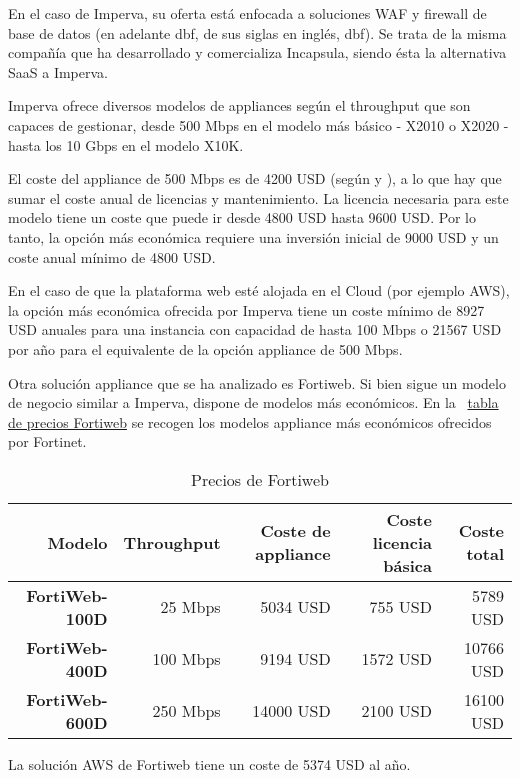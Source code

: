 \par En el caso de Imperva, su oferta está enfocada a soluciones WAF y firewall de base de datos (en adelante \acrshort{dbf}, de sus siglas en
inglés, \acrlong{dbf}). Se trata de la misma compañía que ha desarrollado y comercializa Incapsula, siendo ésta la alternativa SaaS a Imperva.
\par Imperva ofrece diversos modelos de appliances según el throughput que son capaces de gestionar, desde 500 Mbps en el modelo más
básico - X2010 o X2020 - hasta los 10 Gbps en el modelo X10K. \par El coste del appliance de 500 Mbps es de 4200 USD (según \cite{impervacost1} y
\cite{impervacost2}), a lo que hay que sumar el coste anual de licencias y mantenimiento. La licencia necesaria para este modelo tiene un
coste que puede ir desde 4800 USD\cite{impervacost3} hasta 9600 USD\cite{impervacost4}. Por lo tanto, la opción más económica requiere una
inversión inicial de 9000 USD y un coste anual mínimo de 4800 USD.

\par En el caso de que la plataforma web esté alojada en el Cloud (por ejemplo AWS), la opción más económica ofrecida por Imperva tiene un
coste mínimo de 8927 USD anuales para una instancia con capacidad de hasta 100 Mbps\cite{impervaawscost1} o 21567 USD por año para el equivalente de
la opción appliance de 500 Mbps\cite{impervaawscost2}.

\par Otra solución appliance que se ha analizado es Fortiweb. Si bien sigue un modelo de negocio similar a Imperva, dispone de modelos más
económicos. En la {~\hyperref[tab:preciosfortiweb]{tabla de precios Fortiweb}} se recogen los modelos appliance más económicos ofrecidos por
Fortinet.

\begin{table}[h!]
  \centering
  \label{tab:preciosfortiweb}
  \begin{tabular}{|r|r|r|r|r|}
    \hline
    Modelo                  & Throughput & Coste de appliance             & Coste licencia básica          & Coste total  \\
    \hline
    \textbf{FortiWeb-100D}  & 25 Mbps    & 5034 USD\cite{fortiwebcost1}  & 755 USD\cite{fortiwebcost1}   &  5789 USD    \\
    \hline
    \textbf{FortiWeb-400D}  & 100 Mbps   & 9194 USD\cite{fortiwebcost2}  & 1572 USD\cite{fortiwebcost2}  & 10766 USD    \\
    \hline
    \textbf{FortiWeb-600D}  & 250 Mbps   & 14000 USD\cite{fortiwebcost3} & 2100  USD\cite{fortiwebcost3} & 16100 USD    \\
    \hline
  \end{tabular}
  \caption{Precios de Fortiweb}
\end{table}
\par La solución AWS de Fortiweb tiene un coste de 5374 USD\cite{fortiwebcost4} al año.

